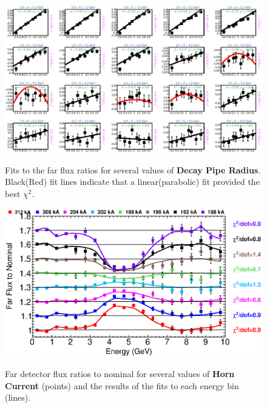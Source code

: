{\begin{figure}[ht]
  \begin{center}
    {\includegraphics[width=5.0in]{figures/DecayPipeRadius_far_fits.eps}}
  \end{center}
\caption{ Fits to the far flux ratios for several values of {\bf Decay Pipe Radius}. Black(Red) fit lines indicate that a linear(parabolic) fit provided the best $\chi^2$. }
\end{figure}

\begin{figure}[ht]
  \begin{center}
    {\includegraphics[width=6.0in]{figures/HornCurrent_far_summary.eps}}
  \end{center}
\caption{ Far detector flux ratios to nominal for several values of {\bf Horn Current} (points) and the results of the fits to each energy bin (lines).}
\end{figure}

}
